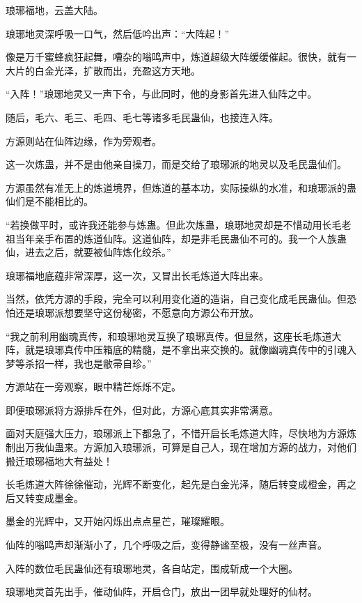 
\begin{this_body}

琅琊福地，云盖大陆。

琅琊地灵深呼吸一口气，然后低吟出声：“大阵起！”

像是万千蜜蜂疯狂起舞，嘈杂的嗡鸣声中，炼道超级大阵缓缓催起。很快，就有一大片的白金光泽，扩散而出，充盈这方天地。

“入阵！”琅琊地灵又一声下令，与此同时，他的身影首先进入仙阵之中。

随后，毛六、毛三、毛四、毛七等诸多毛民蛊仙，也接连入阵。

方源则站在仙阵边缘，作为旁观者。

这一次炼蛊，并不是由他亲自操刀，而是交给了琅琊派的地灵以及毛民蛊仙们。

方源虽然有准无上的炼道境界，但炼道的基本功，实际操纵的水准，和琅琊派的蛊仙们是不能相比的。

“若换做平时，或许我还能参与炼蛊。但此次炼蛊，琅琊地灵却是不惜动用长毛老祖当年亲手布置的炼道仙阵。这道仙阵，却是非毛民蛊仙不可的。我一个人族蛊仙，进去之后，就要被仙阵炼化绞杀。”

琅琊福地底蕴非常深厚，这一次，又冒出长毛炼道大阵出来。

当然，依凭方源的手段，完全可以利用变化道的造诣，自己变化成毛民蛊仙。但恐怕还是琅琊派想要坚守这份秘密，不愿意向方源公布开放。

“我之前利用幽魂真传，和琅琊地灵互换了琅琊真传。但显然，这座长毛炼道大阵，就是琅琊真传中压箱底的精髓，是不拿出来交换的。就像幽魂真传中的引魂入梦等杀招一样，我也是敝帚自珍。”

方源站在一旁观察，眼中精芒烁烁不定。

即便琅琊派将方源排斥在外，但对此，方源心底其实非常满意。

面对天庭强大压力，琅琊派上下都急了，不惜开启长毛炼道大阵，尽快地为方源炼制出万我仙蛊来。方源加入琅琊派，可算是自己人，现在增加方源的战力，对他们搬迁琅琊福地大有益处！

长毛炼道大阵徐徐催动，光辉不断变化，起先是白金光泽，随后转变成橙金，再之后又转变成墨金。

墨金的光辉中，又开始闪烁出点点星芒，璀璨耀眼。

仙阵的嗡鸣声却渐渐小了，几个呼吸之后，变得静谧至极，没有一丝声音。

入阵的数位毛民蛊仙还有琅琊地灵，各自站定，围成斩成一个大圈。

琅琊地灵首先出手，催动仙阵，开启仓门，放出一团早就处理好的仙材。


\end{this_body}
